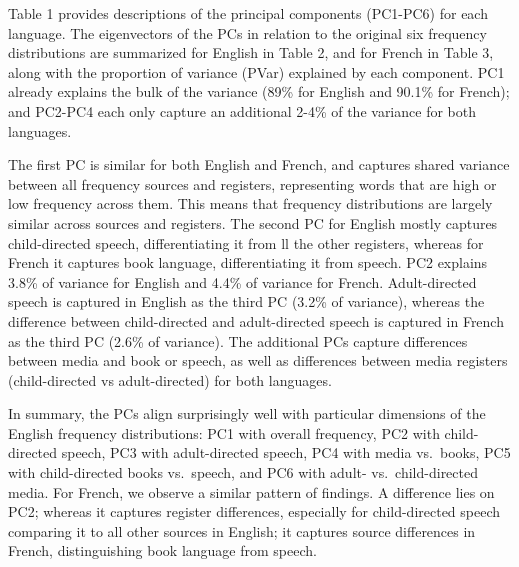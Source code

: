 \documentclass[10pt, letterpaper]{article}
\begin{document}
Table 1 provides descriptions of the principal components (PC1-PC6) for
each language. The eigenvectors of the PCs in relation to the original
six frequency distributions are summarized for English in Table 2, and
for French in Table 3, along with the proportion of variance (PVar)
explained by each component. PC1 already explains the bulk of the
variance (89\% for English and 90.1\% for French); and PC2-PC4 each only
capture an additional 2-4\% of the variance for both languages.

The first PC is similar for both English and French, and captures shared
variance between all frequency sources and registers, representing words
that are high or low frequency across them. This means that frequency
distributions are largely similar across sources and registers. The
second PC for English mostly captures child-directed speech,
differentiating it from ll the other registers, whereas for French it
captures book language, differentiating it from speech. PC2 explains
3.8\% of variance for English and 4.4\% of variance for French.
Adult-directed speech is captured in English as the third PC (3.2\% of
variance), whereas the difference between child-directed and
adult-directed speech is captured in French as the third PC (2.6\% of
variance). The additional PCs capture differences between media and book
or speech, as well as differences between media registers
(child-directed vs adult-directed) for both languages.

In summary, the PCs align surprisingly well with particular dimensions
of the English frequency distributions: PC1 with overall frequency, PC2
with child-directed speech, PC3 with adult-directed speech, PC4 with
media vs.~books, PC5 with child-directed books vs.~speech, and PC6 with
adult- vs.~child-directed media. For French, we observe a similar
pattern of findings. A difference lies on PC2; whereas it captures
register differences, especially for child-directed speech comparing it
to all other sources in English; it captures source differences in
French, distinguishing book language from speech.
\end{document}
